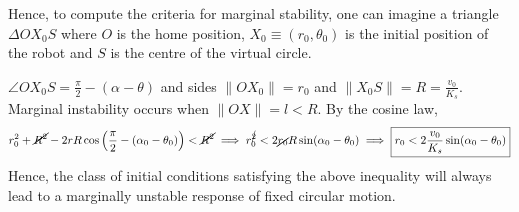 \documentclass[12pt]{article}
\begin{document}
Hence, to compute the criteria for marginal stability, one can imagine a triangle \(\Delta OX_0S\) where \(O\) is the home position, \(X_0\equiv(r_0,\theta_0)\) is the initial position of the robot and \(S\) is the centre of the virtual circle.

\(\displaystyle\angle OX_0S=\frac{\pi}{2}-(\alpha-\theta)\) and sides \(\|OX_0\|=r_0\) and \(\displaystyle\|X_0S\|=R=\frac{v_0}{K_s}\). Marginal instability occurs when \(\|OX\|=l<R\). By the cosine law,
\[
	r_0^2 + \cancel{R^2} - 2rR\cos\left(\frac{\pi}{2}-(\alpha_0-\theta_0)\right) < \cancel{R^2}
	\implies r_0^{\cancel{2}} < 2\cancel{r_0}R\sin(\alpha_0-\theta_0)
	\implies \boxed{r_0<2\frac{v_0}{K_s}\sin(\alpha_0-\theta_0)}
\]
Hence, the class of initial conditions satisfying the above inequality will always lead to a marginally unstable response of fixed circular motion.
\end{document}
